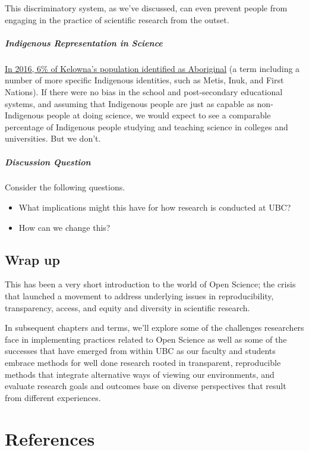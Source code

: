 \documentclass[
]{book}
\providecommand{\tightlist}{%
  \setlength{\itemsep}{0pt}\setlength{\parskip}{0pt}}
\begin{document}
This discriminatory system, as we've discussed, can even prevent people from engaging in the practice of scientific research from the outset.

\hypertarget{indigenous-representation-in-science}{%
\paragraph*{Indigenous Representation in Science}\label{indigenous-representation-in-science}}

\href{https://www12.statcan.gc.ca/census-recensement/2016/as-sa/fogs-spg/Facts-cma-eng.cfm?LANG=Eng\&GK=CMA\&GC=915\&TOPIC=9}{In 2016, 6\% of Kelowna's population identified as Aboriginal} (a term including a number of more specific Indigenous identities, such as Metis, Inuk, and First Nations). If there were no bias in the school and post-secondary educational systems, and assuming that Indigenous people are just as capable as non-Indigenous people at doing science, we would expect to see a comparable percentage of Indigenous people studying and teaching science in colleges and universities. But we don't.

\hypertarget{discussion-question}{%
\paragraph*{Discussion Question}\label{discussion-question}}

Consider the following questions.

\begin{itemize}
\tightlist
\item
  What implications might this have for how research is conducted at UBC?
\item
  How can we change this?
\end{itemize}

\hypertarget{wrap-up}{%
\section{Wrap up}\label{wrap-up}}

This has been a very short introduction to the world of Open Science; the crisis that launched a movement to address underlying issues in reproducibility, transparency, access, and equity and diversity in scientific research.

In subsequent chapters and terms, we'll explore some of the challenges researchers face in implementing practices related to Open Science as well as some of the successes that have emerged from within UBC as our faculty and students embrace methods for well done research rooted in transparent, reproducible methods that integrate alternative ways of viewing our environments, and evaluate research goals and outcomes base on diverse perspectives that result from different experiences.

\hypertarget{references}{%
\chapter{References}\label{references}}

  
\end{document}
